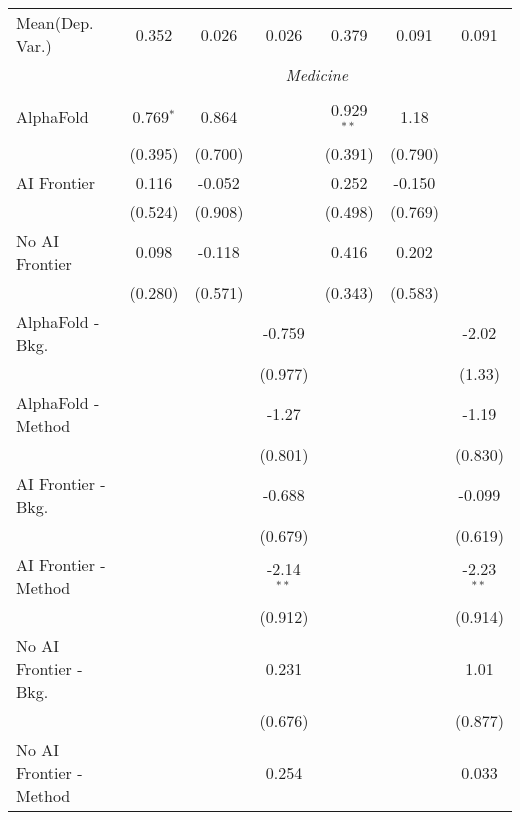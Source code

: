 \begin{tabular}{lcccccc}
Mean(Dep. Var.) & 0.352 & 0.026 & 0.026 & 0.379 & 0.091 & 0.091 \\
 & \multicolumn{6}{c}{\textit{Medicine}} \\ \\
   AlphaFold               & 0.769$^{*}$ & 0.864   &              & 0.929$^{**}$ & 1.18    &   \\   
                           & (0.395)     & (0.700) &              & (0.391)      & (0.790) &   \\   
   AI Frontier             & 0.116       & -0.052  &              & 0.252        & -0.150  &   \\   
                           & (0.524)     & (0.908) &              & (0.498)      & (0.769) &   \\   
   No AI Frontier          & 0.098       & -0.118  &              & 0.416        & 0.202   &   \\   
                           & (0.280)     & (0.571) &              & (0.343)      & (0.583) &   \\   
   AlphaFold - Bkg.        &             &         & -0.759       &              &         & -2.02\\   
                           &             &         & (0.977)      &              &         & (1.33)\\   
   AlphaFold - Method      &             &         & -1.27        &              &         & -1.19\\   
                           &             &         & (0.801)      &              &         & (0.830)\\   
   AI Frontier - Bkg.      &             &         & -0.688       &              &         & -0.099\\   
                           &             &         & (0.679)      &              &         & (0.619)\\   
   AI Frontier - Method    &             &         & -2.14$^{**}$ &              &         & -2.23$^{**}$\\   
                           &             &         & (0.912)      &              &         & (0.914)\\   
   No AI Frontier - Bkg.   &             &         & 0.231        &              &         & 1.01\\   
                           &             &         & (0.676)      &              &         & (0.877)\\   
   No AI Frontier - Method &             &         & 0.254        &              &         & 0.033\\   

\end{tabular}
